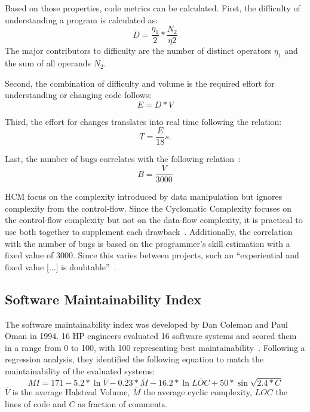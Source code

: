 Based on those properties, code metrics can be calculated. 
First, the difficulty of understanding a program is calculated as:
\begin{displaymath}
    D = \frac{\eta_1}{2} * \frac{N_2}{\eta2}
\end{displaymath}
The major contributors to difficulty are the number of distinct operators $\eta_1$ and the sum of all operands $N_2$.

Second, the combination of difficulty and volume is the required effort for understanding or changing code follows:
\begin{displaymath}
    E = D * V
\end{displaymath}

Third, the effort for changes translates into real time following the relation:
\begin{displaymath}
    T = \frac{E}{18}s.
\end{displaymath}

Last, the number of bugs correlates with the following relation~\cite{yu_survey_2010}:
\begin{displaymath}
    B = \frac{V}{3000}
\end{displaymath}

HCM focus on the complexity introduced by data manipulation but ignores complexity from the control-flow. Since the Cyclomatic Complexity focuses on the control-flow complexity but not on the data-flow complexity, it is practical to use both together to supplement each drawback~\cite{yu_survey_2010}.
Additionally, the correlation with the number of bugs is based on the programmer's skill estimation with a fixed value of 3000. Since this varies between projects, such an \enquote{experiential and fixed value [...] is doubtable}~\cite{yu_survey_2010}.

\subsection{Software Maintainability Index}
The software maintainability index was developed by Dan Coleman and Paul Oman in 1994. 16 HP engineers evaluated 16 software systems and scored them in a range from 0 to 100, with 100 representing best maintainability~\cite{coleman_using_1994}. 
Following a regression analysis, they identified the following equation to match the maintainability of the evaluated systems:
\begin{displaymath}
MI = 171 - 5.2 *\ln{\overline{V}} - 0.23 * \overline{M} - 16.2 * \ln{\overline{LOC}} + 50 * \sin{\sqrt{2.4 * C}}
\end{displaymath}
$\overline{V}$ is the average Halstead Volume, $\overline{M}$ the average cyclic complexity, $LOC$ the lines of code and $C$ as fraction of comments.

